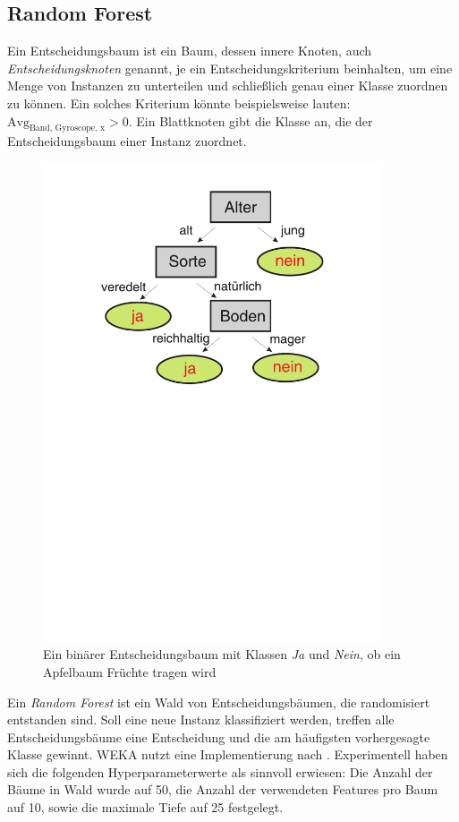 \subsection{Random Forest}
\begin{definition}[Entscheidungsbaum]
Ein Entscheidungsbaum ist ein Baum, dessen innere Knoten, auch \textit{Entscheidungsknoten} genannt, je ein Entscheidungskriterium beinhalten, um eine Menge von Instanzen zu unterteilen und schließlich genau einer Klasse zuordnen zu können. Ein solches Kriterium könnte beispielsweise lauten: $\text{Avg}_\text{Band, Gyroscope, x} > 0$. Ein Blattknoten gibt die Klasse an, die der Entscheidungsbaum einer Instanz zuordnet.
\end{definition}\label{def:entscheidungsbaum}
\begin{figure}[htb]
\centering
\includegraphics[width=100mm, trim=0 150mm 0 0]{img/entscheidungsbaum}
\caption{Ein binärer Entscheidungsbaum mit Klassen \textit{Ja} und \textit{Nein}, ob ein Apfelbaum Früchte tragen wird}
\end{figure}
Ein \textit{Random Forest} ist ein Wald von Entscheidungsbäumen, die randomisiert entstanden sind. Soll eine neue Instanz klassifiziert werden, treffen alle Entscheidungsbäume eine Entscheidung und die am häufigsten vorhergesagte Klasse gewinnt. WEKA nutzt eine Implementierung nach \cite{Breiman2001}. Experimentell haben sich die folgenden Hyperparameterwerte als sinnvoll erwiesen: Die Anzahl der Bäume in Wald wurde auf 50, die Anzahl der verwendeten Features pro Baum auf 10, sowie die maximale Tiefe auf 25 festgelegt.
